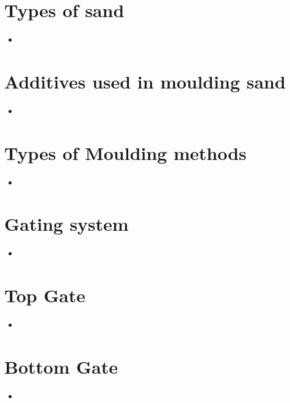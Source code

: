 \documentclass[8pt]{report}
\begin{document}
\section{Types of sand}
	\begin{itemize}
		\item
	\end{itemize}\hrulefill
\section{Additives used in moulding sand}
	\begin{itemize}
		\item
	\end{itemize}\hrulefill
\section{Types of Moulding methods}
	\begin{itemize}
		\item
	\end{itemize}\hrulefill
\section{Gating system}
	\begin{itemize}
		\item
	\end{itemize}\hrulefill
\section{Top Gate}
	\begin{itemize}
		\item
	\end{itemize}\hrulefill
\section{Bottom Gate}
	\begin{itemize}
		\item
	\end{itemize}\hrulefill
\end{document}

